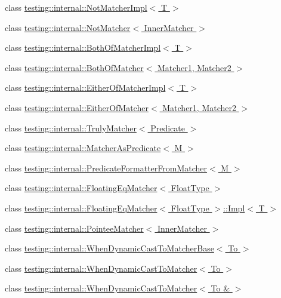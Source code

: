 \begin{DoxyCompactItemize}
\item 
class \hyperlink{classtesting_1_1internal_1_1NotMatcherImpl}{testing\+::internal\+::\+Not\+Matcher\+Impl$<$ T $>$}
\item 
class \hyperlink{classtesting_1_1internal_1_1NotMatcher}{testing\+::internal\+::\+Not\+Matcher$<$ Inner\+Matcher $>$}
\item 
class \hyperlink{classtesting_1_1internal_1_1BothOfMatcherImpl}{testing\+::internal\+::\+Both\+Of\+Matcher\+Impl$<$ T $>$}
\item 
class \hyperlink{classtesting_1_1internal_1_1BothOfMatcher}{testing\+::internal\+::\+Both\+Of\+Matcher$<$ Matcher1, Matcher2 $>$}
\item 
class \hyperlink{classtesting_1_1internal_1_1EitherOfMatcherImpl}{testing\+::internal\+::\+Either\+Of\+Matcher\+Impl$<$ T $>$}
\item 
class \hyperlink{classtesting_1_1internal_1_1EitherOfMatcher}{testing\+::internal\+::\+Either\+Of\+Matcher$<$ Matcher1, Matcher2 $>$}
\item 
class \hyperlink{classtesting_1_1internal_1_1TrulyMatcher}{testing\+::internal\+::\+Truly\+Matcher$<$ Predicate $>$}
\item 
class \hyperlink{classtesting_1_1internal_1_1MatcherAsPredicate}{testing\+::internal\+::\+Matcher\+As\+Predicate$<$ M $>$}
\item 
class \hyperlink{classtesting_1_1internal_1_1PredicateFormatterFromMatcher}{testing\+::internal\+::\+Predicate\+Formatter\+From\+Matcher$<$ M $>$}
\item 
class \hyperlink{classtesting_1_1internal_1_1FloatingEqMatcher}{testing\+::internal\+::\+Floating\+Eq\+Matcher$<$ Float\+Type $>$}
\item 
class \hyperlink{classtesting_1_1internal_1_1FloatingEqMatcher_1_1Impl}{testing\+::internal\+::\+Floating\+Eq\+Matcher$<$ Float\+Type $>$\+::\+Impl$<$ T $>$}
\item 
class \hyperlink{classtesting_1_1internal_1_1PointeeMatcher}{testing\+::internal\+::\+Pointee\+Matcher$<$ Inner\+Matcher $>$}
\item 
class \hyperlink{classtesting_1_1internal_1_1WhenDynamicCastToMatcherBase}{testing\+::internal\+::\+When\+Dynamic\+Cast\+To\+Matcher\+Base$<$ To $>$}
\item 
class \hyperlink{classtesting_1_1internal_1_1WhenDynamicCastToMatcher}{testing\+::internal\+::\+When\+Dynamic\+Cast\+To\+Matcher$<$ To $>$}
\item 
class \hyperlink{classtesting_1_1internal_1_1WhenDynamicCastToMatcher_3_01To_01_6_01_4}{testing\+::internal\+::\+When\+Dynamic\+Cast\+To\+Matcher$<$ To \& $>$}

\end{DoxyCompactItemize}
